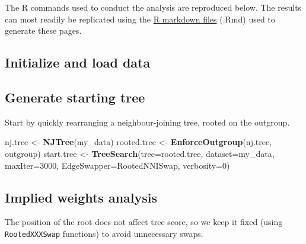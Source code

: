 \documentclass[openany]{book}
\newenvironment{Shaded}{\begin{snugshade}}{\end{snugshade}}
\newcommand{\KeywordTok}[1]{\textcolor[rgb]{0.13,0.29,0.53}{\textbf{#1}}}
\newcommand{\DataTypeTok}[1]{\textcolor[rgb]{0.13,0.29,0.53}{#1}}
\newcommand{\DecValTok}[1]{\textcolor[rgb]{0.00,0.00,0.81}{#1}}
\newcommand{\StringTok}[1]{\textcolor[rgb]{0.31,0.60,0.02}{#1}}
\newcommand{\CommentTok}[1]{\textcolor[rgb]{0.56,0.35,0.01}{\textit{#1}}}
\newcommand{\NormalTok}[1]{#1}
\theoremstyle{definition}
\theoremstyle{definition}
\theoremstyle{definition}
\theoremstyle{remark}
\begin{document}
The R commands used to conduct the analysis are reproduced below. The
results can most readily be replicated using the
\href{https://github.com/ms609/hyoliths/}{R markdown files} (.Rmd) used
to generate these pages.

\subsection{Initialize and load data}\label{initialize-and-load-data}

\begin{Shaded}
\end{Shaded}

\subsection{Generate starting tree}\label{generate-starting-tree}

Start by quickly rearranging a neighbour-joining tree, rooted on the
outgroup.

\begin{Shaded}
\begin{Highlighting}[]
\NormalTok{nj.tree <-}\StringTok{ }\KeywordTok{NJTree}\NormalTok{(my_data)}
\NormalTok{rooted.tree <-}\StringTok{ }\KeywordTok{EnforceOutgroup}\NormalTok{(nj.tree, outgroup)}
\NormalTok{start.tree <-}\StringTok{ }\KeywordTok{TreeSearch}\NormalTok{(}\DataTypeTok{tree=}\NormalTok{rooted.tree, }\DataTypeTok{dataset=}\NormalTok{my_data, }\DataTypeTok{maxIter=}\DecValTok{3000}\NormalTok{,}
                         \DataTypeTok{EdgeSwapper=}\NormalTok{RootedNNISwap, }\DataTypeTok{verbosity=}\DecValTok{0}\NormalTok{)}
\end{Highlighting}
\end{Shaded}

\subsection{Implied weights analysis}\label{implied-weights-analysis}

The position of the root does not affect tree score, so we keep it fixed
(using \texttt{RootedXXXSwap} functions) to avoid unnecessary swaps.
\end{document}
